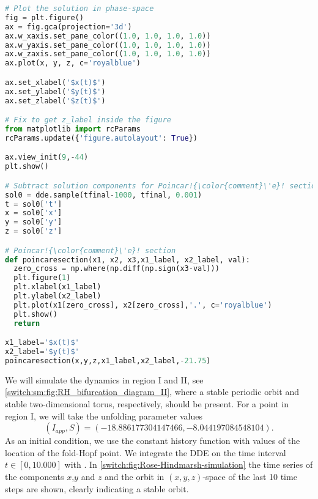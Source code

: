 \begin{lstlisting}[language=Python,escapechar=!]
# Plot the solution in phase-space
fig = plt.figure()
ax = fig.gca(projection='3d')
ax.w_xaxis.set_pane_color((1.0, 1.0, 1.0, 1.0))
ax.w_yaxis.set_pane_color((1.0, 1.0, 1.0, 1.0))
ax.w_zaxis.set_pane_color((1.0, 1.0, 1.0, 1.0))
ax.plot(x, y, z, c='royalblue')

ax.set_xlabel('$x(t)$')
ax.set_ylabel('$y(t)$')
ax.set_zlabel('$z(t)$')

# Fix to get z_label inside the figure
from matplotlib import rcParams
rcParams.update({'figure.autolayout': True})

ax.view_init(9,-44)
plt.show()

# Subtract solution components for Poincar!{\color{comment}\'e}! section
sol0 = dde.sample(tfinal-1000, tfinal, 0.001)
t = sol0['t']
x = sol0['x']
y = sol0['y']
z = sol0['z']

# Poincar!{\color{comment}\'e}! section
def poincaresection(x1, x2, x3,x1_label, x2_label, val):
  zero_cross = np.where(np.diff(np.sign(x3-val)))
  plt.figure(1)
  plt.xlabel(x1_label)
  plt.ylabel(x2_label)
  plt.plot(x1[zero_cross], x2[zero_cross],'.', c='royalblue')
  plt.show()
  return

x1_label='$x(t)$'
x2_label='$y(t)$'
poincaresection(x,y,z,x1_label,x2_label,-21.75)

\end{lstlisting}
We will simulate the dynamics in region I and II, see \cref{switch:sm:fig:RH_bifurcation_diagram_II}, where a stable periodic orbit and stable two-dimensional torus, respectively, should be present. For a point in region I, we will take the unfolding parameter values 
\[
(I_{app},S)=(-18.886177304147466,-8.044197084548104).
\]
As an initial condition, we use the constant history function with values of the location of the fold-Hopf point. We integrate the DDE on the time interval $t\in[0,10.000]$ with \PYDELAY. In  \cref{switch:fig:Rose-Hindmarsh-simulation} the time series of the components $x$,$y$ and $z$ and the orbit in $(x,y,z)$-space of the last 10 time steps are shown, clearly indicating a stable orbit.

